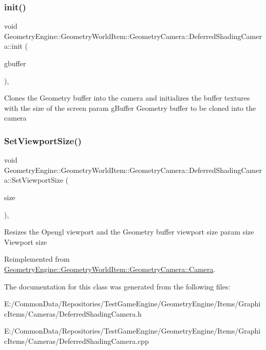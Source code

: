 \subsubsection{\texorpdfstring{init()}{init()}}
{\footnotesize\ttfamily void Geometry\+Engine\+::\+Geometry\+World\+Item\+::\+Geometry\+Camera\+::\+Deferred\+Shading\+Camera\+::init (\begin{DoxyParamCaption}\item[{const \mbox{\hyperlink{class_geometry_engine_1_1_geometry_buffer_1_1_g_buffer}{Geometry\+Buffer\+::\+G\+Buffer}} \&}]{gbuffer }\end{DoxyParamCaption})\hspace{0.3cm}{\ttfamily [protected]}, {\ttfamily [virtual]}}

Clones the Geometry buffer into the camera and initializes the buffer textures with the size of the screen param g\+Buffer Geometry buffer to be cloned into the camera \mbox{\label{class_geometry_engine_1_1_geometry_world_item_1_1_geometry_camera_1_1_deferred_shading_camera_a16da38cfd723b755a63c372c08bbedf7}} 
\subsubsection{\texorpdfstring{SetViewportSize()}{SetViewportSize()}}
{\footnotesize\ttfamily void Geometry\+Engine\+::\+Geometry\+World\+Item\+::\+Geometry\+Camera\+::\+Deferred\+Shading\+Camera\+::\+Set\+Viewport\+Size (\begin{DoxyParamCaption}\item[{const Q\+Vector4D \&}]{size }\end{DoxyParamCaption})\hspace{0.3cm}{\ttfamily [override]}, {\ttfamily [virtual]}}

Resizes the Opengl viewport and the Geometry buffer viewport size param size Viewport size 

Reimplemented from \mbox{\hyperlink{class_geometry_engine_1_1_geometry_world_item_1_1_geometry_camera_1_1_camera_a96954629a05eba955adc1dff2df1fbdb}{Geometry\+Engine\+::\+Geometry\+World\+Item\+::\+Geometry\+Camera\+::\+Camera}}.



The documentation for this class was generated from the following files\+:\begin{DoxyCompactItemize}
\item 
E\+:/\+Common\+Data/\+Repositories/\+Test\+Game\+Engine/\+Geometry\+Engine/\+Items/\+Graphic\+Items/\+Cameras/Deferred\+Shading\+Camera.\+h\item 
E\+:/\+Common\+Data/\+Repositories/\+Test\+Game\+Engine/\+Geometry\+Engine/\+Items/\+Graphic\+Items/\+Cameras/Deferred\+Shading\+Camera.\+cpp\end{DoxyCompactItemize}

